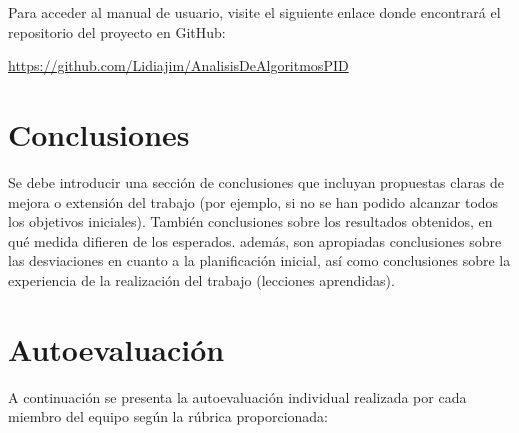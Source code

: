 \documentclass[a4paper]{article}
\begin{document}
Para acceder al manual de usuario, visite el siguiente enlace donde encontrará el repositorio del proyecto en GitHub:

\begin{center}
\url{https://github.com/Lidiajim/AnalisisDeAlgoritmosPID}
\end{center}
\newpage

\section{Conclusiones}

Se debe introducir una sección de conclusiones que incluyan propuestas claras de mejora o extensión del trabajo (por ejemplo, si no se han podido alcanzar todos los objetivos iniciales). También conclusiones sobre los resultados obtenidos, en qué medida difieren de los esperados. además, son apropiadas conclusiones sobre las desviaciones en cuanto a la planificación inicial, así como conclusiones sobre la experiencia de la realización del trabajo (lecciones aprendidas).
\newpage
\section{Autoevaluación}
A continuación se presenta la autoevaluación individual realizada por cada miembro del equipo según la rúbrica proporcionada:
\end{document}
